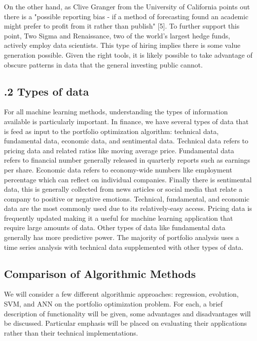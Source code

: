 \documentclass[12pt]{report}
\begin{document}
On the other hand, as Clive Granger from the University of California points out there is a "possible reporting bias - if a method of forecasting found an academic might prefer to profit from it
rather than publish" [5]. To further support this point, Two Sigma and Renaissance, two of the world's largest hedge funds, actively employ data scientists. This type of hiring implies there is some value generation possible. Given the right tools, it is likely possible to take advantage of obscure patterns in data that the general investing public cannot.

\subsection*{.2 Types of data}
For all machine learning methods, understanding the types of information available is particularly important. In finance, we have several types of data that is feed as input to the portfolio optimization algorithm: technical data, fundamental data, economic data, and sentimental data. Technical data refers to pricing data and related ratios like moving average price. Fundamental data refers to financial number generally released in quarterly reports such as earnings per share.  Economic data refers to economy-wide numbers like employment percentage which can reflect on individual companies. Finally there is sentimental data, this is generally collected from news articles or social media that relate a company to positive or negative emotions. Technical, fundamental, and economic data are the most commonly used due to its relatively-easy access. Pricing data is frequently updated making it a useful for machine learning application that require large amounts of data. Other types of data like fundamental data generally has more predictive power. The majority of portfolio analysis uses a time series analysis with technical data supplemented with other types of data.

\subsection*{ Comparison of Algorithmic Methods}

We will consider a few different algorithmic approaches: regression, evolution, SVM, and ANN on the portfolio optimization problem. For each, a brief description of functionality will be given, some advantages and disadvantages will be discussed. Particular emphasis will be placed on evaluating their applications rather than their technical implementations.
\end{document}
